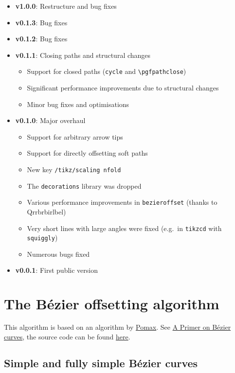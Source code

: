 \documentclass[12pt,a4paper]{article}
\theoremstyle{definition}
\begin{document}
\begin{itemize}
  \item \textbf{v1.0.0}: Restructure and bug fixes
  \item \textbf{v0.1.3}: Bug fixes
  \item \textbf{v0.1.2}: Bug fixes
  \item \textbf{v0.1.1}: Closing paths and structural changes
  \begin{itemize}
    \item Support for closed paths (\texttt{cycle} and \verb|\pgfpathclose|)
    \item Significant performance improvements due to structural changes
    \item Minor bug fixes and optimisations
\end{itemize}
  \item \textbf{v0.1.0}: Major overhaul
  \begin{itemize}
    \item Support for arbitrary arrow tips
    \item Support for directly offsetting soft paths
    \item New key \texttt{/tikz/scaling nfold}
    \item The \texttt{decorations} library was dropped
    \item Various performance improvements in \texttt{bezieroffset} (thanks to \hbox{Qrrbrbirlbel})
    \item Very short lines with large angles were fixed (e.g.\ in \texttt{tikzcd} with \texttt{squiggly})
    \item Numerous bugs fixed
  \end{itemize}
  \item \textbf{v0.0.1}: First public version
\end{itemize}

\appendix
\newpage
\section{The Bézier offsetting algorithm}

This algorithm is based on an algorithm by \href{https://github.com/Pomax/}{Pomax}. See \href{https://pomax.github.io/bezierinfo/#offsetting}{A Primer on Bézier curves}, the source code can be found \href{https://github.com/Pomax/bezierinfo/blob/bcfce2149fa5e5540a2a2605986adab3b2a9a3bf/js/graphics-element/lib/bezierjs/bezier.js}{here}.

\subsection{Simple and fully simple Bézier curves}
\end{document}
